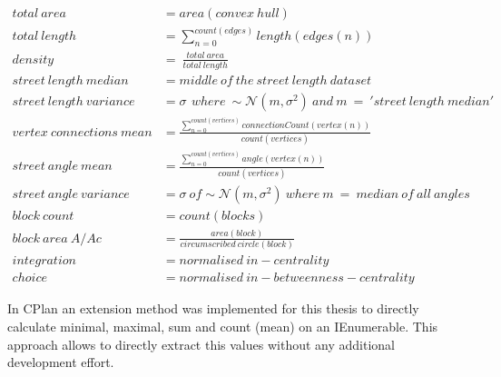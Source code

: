 \begin{align}
    total\ area &= area(convex\ hull)  \\
    total\ length &= \sum_{n=0}^{count(edges)} length(edges(n))\  \\
    density &=\ \frac{total\ area}{total\ length} \\
    street\ length\ median &=  middle\ of\ the\ street\ length\ dataset \\
    street\ length\ variance &= \sigma\,\ where\ \sim\mathcal{N}(m,\sigma^2)\ and\ m\ =\ 'street\ length\ median' \\
    vertex\ connections\ mean &= \frac{\sum_{n=0}^{count(vertices)} connectionCount(vertex(n))}{count(vertices)} \\
    street\ angle\ mean &= \frac{\sum_{n=0}^{count(vertices)} angle(vertex(n))}{count(vertices)} \\
    street\ angle\ variance &= \sigma\ of \sim\mathcal{N}(m,\sigma^2)\ where\ m\ =\ median\ of\ all\ angles \\
    block\ count &= count(blocks) \\
    block\ area\ A/Ac &= \frac{area(block)}{circumscribed\ circle(block)} \\
    integration &= normalised\ in-centrality \\
    choice &= normalised\ in-betweenness-centrality 
\end{align}

In CPlan an extension method was implemented for this thesis to directly calculate minimal, maximal, sum and count (mean) on an IEnumerable. This approach allows to directly extract this values without any additional development effort. 

